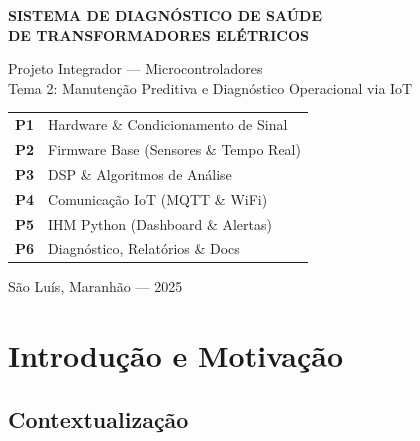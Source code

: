 \documentclass[12pt, a4paper]{article}
\begin{document}
\begin{titlepage}
    \centering
    \vspace*{1.5cm}

    {\Large\bfseries\color{corPrimaria}
        SISTEMA DE DIAGNÓSTICO DE SAÚDE\\[0.4cm]
        DE TRANSFORMADORES ELÉTRICOS\\[0.3cm]
    }

    {\normalsize\color{corCinza}
        Projeto Integrador --- Microcontroladores\\
        Tema 2: Manutenção Preditiva e Diagnóstico Operacional via IoT\\[2.5cm]
    }

    \begin{tcolorbox}[caixaInfo, title={Equipe de Desenvolvimento}, width=10cm]
        \begin{center}
        \begin{tabular}{ll}
            \textbf{P1} & Hardware \& Condicionamento de Sinal \\[2pt]
            \textbf{P2} & Firmware Base (Sensores \& Tempo Real) \\[2pt]
            \textbf{P3} & DSP \& Algoritmos de Análise \\[2pt]
            \textbf{P4} & Comunicação IoT (MQTT \& WiFi) \\[2pt]
            \textbf{P5} & IHM Python (Dashboard \& Alertas) \\[2pt]
            \textbf{P6} & Diagnóstico, Relatórios \& Docs \\
        \end{tabular}
        \end{center}
    \end{tcolorbox}

    \vfill

    {\normalsize São Luís, Maranhão --- 2025}
\end{titlepage}

\tableofcontents
\newpage

\section{Introdução e Motivação}

\subsection{Contextualização}
\end{document}
